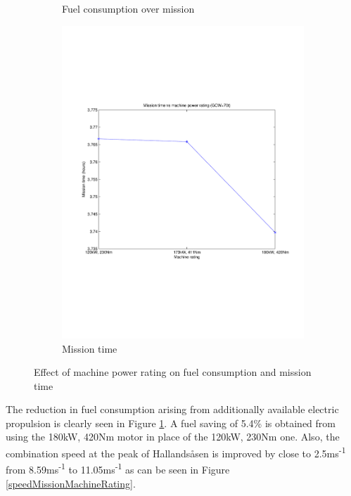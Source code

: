\documentclass{article}
\begin{document}
\begin{figure}[h!]
\begin{subfigure}{.5\textwidth}
	\caption{Fuel consumption over mission}
\end{subfigure}
\begin{subfigure}{.5\textwidth}
	\centering
	\includegraphics[width=\linewidth, clip=true, trim=45 185 65 206]{Figures/Effect_of_machine_power_rating/Mission_time_vs_machine_power_rating.pdf}
	\caption{Mission time}
\end{subfigure}
\caption{Effect of machine power rating on fuel consumption and mission time}
\label{fuelTimeEngineAxleLoad}
\end{figure}

The reduction in fuel consumption arising from additionally available electric propulsion is clearly seen in Figure \ref{fuelTimeEngineAxleLoad}. A fuel saving of 5.4\% is obtained from using the 180kW, 420Nm motor in place of the 120kW, 230Nm one. Also, the combination speed at the peak of Hallands\aa sen is improved by close to 2.5ms\textsuperscript{-1} from 8.59ms\textsuperscript{-1} to 11.05ms\textsuperscript{-1} as can be seen in Figure \ref{speedMissionMachineRating}.\\
\end{document}
